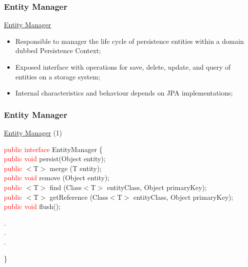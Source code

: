 \documentclass[xcolor=x11names,compress]{beamer}
\renewcommand{\(}{\begin{columns}}
\renewcommand{\)}{\end{columns}}
\newcommand{\<}[1]{\begin{column}{#1}}
\renewcommand{\>}{\end{column}}
\begin{document}
\subsubsection{Entity Manager}
\begin{frame}{\underline{Entity Manager}}

\begin{itemize}
\itemsep 12pt
\justifying

\item Responsible to manager the life cycle of persistence entities within a domain dubbed Persistence Context;

\item Exposed interface with operations for save, delete, update, and query of entities on a storage system;

\item Internal characteristics and behaviour depends on JPA implementations;
\end{itemize}
\end{frame}
\subsubsection{Entity Manager}
\begin{frame}{\underline{Entity Manager} (1)}

{\footnotesize

\textcolor{red}{public interface} EntityManager \{ \\[2mm]

\textcolor{red}{public void} persist(Object entity); \\[2mm]

\textcolor{red}{public} $<$T$>$ merge (T entity); \\[2mm]

\textcolor{red}{public void} remove (Object entity); \\[2mm]

\textcolor{red}{public} $<$T$>$ find (Class$<$T$>$ entityClass, Object primaryKey); \\[2mm]

\textcolor{red}{public} $<$T$>$ getReference (Class$<$T$>$ entityClass, Object primaryKey); \\[2mm]

\textcolor{red}{public void} flush(); \\
\begin{center}
. \\
. \\
. \\
\end{center}
\}
}
\end{frame}
\end{document}
